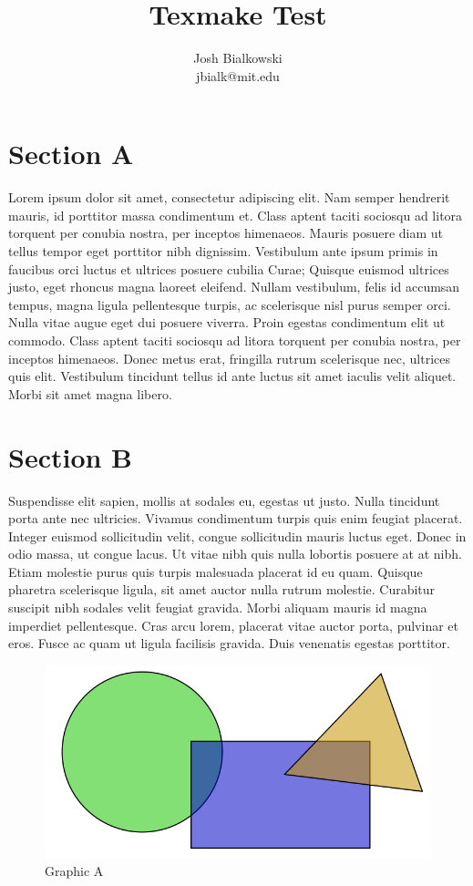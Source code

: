 \documentclass[10pt,oneside]{article}
\title{Texmake Test}
\author{Josh Bialkowski \\ \small jbialk@mit.edu}
\begin{document}
\maketitle
\section{Section A}

Lorem ipsum dolor sit amet, consectetur adipiscing elit. Nam semper hendrerit mauris, id porttitor massa condimentum et. Class aptent taciti sociosqu ad litora torquent per conubia nostra, per inceptos himenaeos. Mauris posuere diam ut tellus tempor eget porttitor nibh dignissim. Vestibulum ante ipsum primis in faucibus orci luctus et ultrices posuere cubilia Curae; Quisque euismod ultrices justo, eget rhoncus magna laoreet eleifend. Nullam vestibulum, felis id accumsan tempus, magna ligula pellentesque turpis, ac scelerisque nisl purus semper orci. Nulla vitae augue eget dui posuere viverra. Proin egestas condimentum elit ut commodo. Class aptent taciti sociosqu ad litora torquent per conubia nostra, per inceptos himenaeos. Donec metus erat, fringilla rutrum scelerisque nec, ultrices quis elit. Vestibulum tincidunt tellus id ante luctus sit amet iaculis velit aliquet. Morbi sit amet magna libero.



\section{Section B}

Suspendisse elit sapien, mollis at sodales eu, egestas ut justo. Nulla tincidunt porta ante nec ultricies. Vivamus condimentum turpis quis enim feugiat placerat. Integer euismod sollicitudin velit, congue sollicitudin mauris luctus eget. Donec in odio massa, ut congue lacus. Ut vitae nibh quis nulla lobortis posuere at at nibh. Etiam molestie purus quis turpis malesuada placerat id eu quam. Quisque pharetra scelerisque ligula, sit amet auctor nulla rutrum molestie. Curabitur suscipit nibh sodales velit feugiat gravida. Morbi aliquam mauris id magna imperdiet pellentesque. Cras arcu lorem, placerat vitae auctor porta, pulvinar et eros. Fusce ac quam ut ligula facilisis gravida. Duis venenatis egestas porttitor. \cite{book_a}


\begin{figure}[h]
\begin{centering}
    \includegraphics[scale=1]{fig/a}
    \caption{Graphic A}
\end{centering}
\end{figure}
\end{document}
